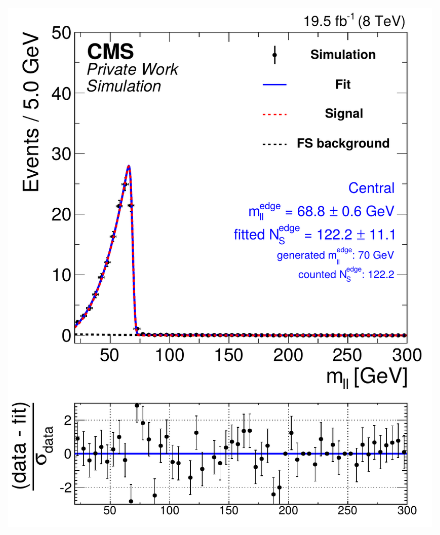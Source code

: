 \begin{figure}[hbp]
\begin{minipage}[t]{0.49\textwidth}
    \includegraphics[width=\textwidth]{plots/results/fit/mcFits/shapeIllustrationKX4_SignalInclusive_Combined_Full2012_KX4_MC_edge_400_150_80_Central.pdf}
  \end{minipage}
  \begin{minipage}[t]{0.49\textwidth}

\end{minipage}
\end{figure}
